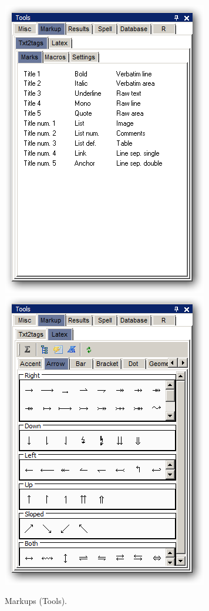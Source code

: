 \begin{figure}[h!]
  \includegraphics[scale=0.35]{./res/tools_markup_txt2tags_marks.png}~~
  \includegraphics[scale=0.35]{./res/tools_markup_latex_arrows.png}\\
  \caption{Markups (Tools).}
  \label{fig:tools_markup_txt2tags_options}
\end{figure}

